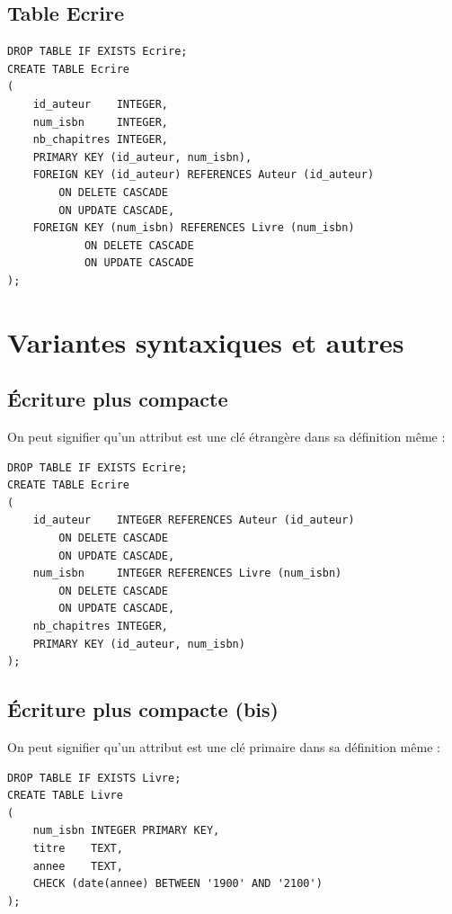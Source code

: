 \subsection{Table \textbf{Ecrire}}
\begin{sql}
    \begin{verbatim}
DROP TABLE IF EXISTS Ecrire;
CREATE TABLE Ecrire
(
    id_auteur    INTEGER,
    num_isbn     INTEGER,
    nb_chapitres INTEGER,
    PRIMARY KEY (id_auteur, num_isbn),
    FOREIGN KEY (id_auteur) REFERENCES Auteur (id_auteur)
        ON DELETE CASCADE
        ON UPDATE CASCADE,
    FOREIGN KEY (num_isbn) REFERENCES Livre (num_isbn)
            ON DELETE CASCADE
            ON UPDATE CASCADE
);
\end{verbatim}
\end{sql}

\section{Variantes syntaxiques et autres}
\subsection{\'Ecriture plus compacte}
On peut signifier qu'un attribut est une clé étrangère dans sa définition même :
\begin{sql}
    \begin{verbatim}
DROP TABLE IF EXISTS Ecrire;
CREATE TABLE Ecrire
(
    id_auteur    INTEGER REFERENCES Auteur (id_auteur)
        ON DELETE CASCADE
        ON UPDATE CASCADE,
    num_isbn     INTEGER REFERENCES Livre (num_isbn)
        ON DELETE CASCADE
        ON UPDATE CASCADE,
    nb_chapitres INTEGER,
    PRIMARY KEY (id_auteur, num_isbn)
);
\end{verbatim}
\end{sql}


\subsection{\'Ecriture plus compacte (bis)}
On peut signifier qu'un attribut est une clé primaire dans sa définition même :
\begin{sql}
    \begin{verbatim}
DROP TABLE IF EXISTS Livre;
CREATE TABLE Livre
(
    num_isbn INTEGER PRIMARY KEY,
    titre    TEXT,
    annee    TEXT,
    CHECK (date(annee) BETWEEN '1900' AND '2100')
);
\end{verbatim}
\end{sql}



